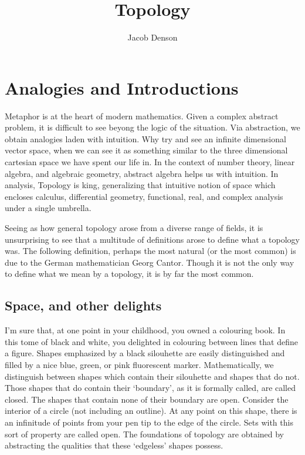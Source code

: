 \documentclass{report}
\title{Topology}
\author{Jacob Denson}
\theoremstyle{plain}
\theoremstyle{definition}
\begin{document}

\maketitle

\tableofcontents


\chapter{Analogies and Introductions}

Metaphor is at the heart of modern mathematics. Given a complex abstract problem, it is difficult to see beyong the logic of the situation. Via abstraction, we obtain analogies laden with intuition. Why try and see an infinite dimensional vector space, when we can see it as something similar to the three dimensional cartesian space we have spent our life in. In the context of number theory, linear algebra, and algebraic geometry, abstract algebra helps us with intuition. In analysis, Topology is king, generalizing that intuitive notion of space which encloses calculus, differential geometry, functional, real, and complex analysis under a single umbrella.

Seeing as how general topology arose from a diverse range of fields, it is unsurprising to see that a multitude of definitions arose to define what a topology was. The following definition, perhaps the most natural (or the most common) is due to the German mathematician Georg Cantor. Though it is not the only way to define what we mean by a topology, it is by far the most common.

\section{Space, and other delights}

I'm sure that, at one point in your childhood, you owned a colouring book. In this tome of black and white, you delighted in colouring between lines that define a figure. Shapes emphasized by a black silouhette are easily distinguished and filled by a nice blue, green, or pink fluorescent marker. Mathematically, we distinguish between shapes which contain their silouhette and shapes that do not. Those shapes that do contain their `boundary', as it is formally called, are called closed. The shapes that contain none of their boundary are open. Consider the interior of a circle (not including an outline). At any point on this shape, there is an infinitude of points from your pen tip to the edge of the circle. Sets with this sort of property are called open. The foundations of topology are obtained by abstracting the qualities that these `edgeless' shapes possess.
\end{document}
